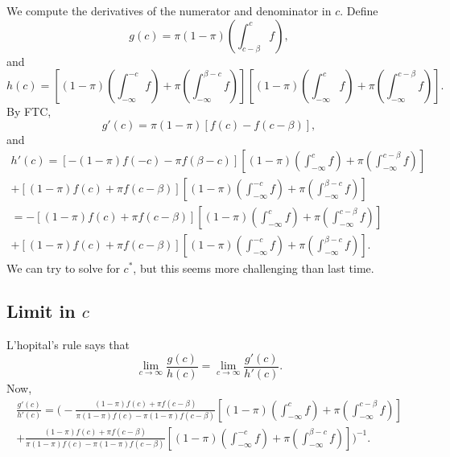 \documentclass[12pt]{article}
\begin{document}
We compute the derivatives of the numerator and denominator in $c$. Define $$g(c) = \pi (1-\pi) \left( \int_{c-\beta}^c f \right),$$ and $$ h(c) = \left[ (1-\pi)  \left( \int_{-\infty}^{-c} f \right)+ \pi \left( \int_{-\infty}^{\beta - c} f\right) \right] \left[  (1 - \pi) \left( \int_{-\infty}^c f \right) + \pi \left( \int_{-\infty}^{c- \beta} f\right)  \right].$$ By FTC,
$$ g'(c) = \pi (1 -\pi) [  f(c) - f(c - \beta)],$$ and
\begin{multline*}
h'(c) = [-(1-\pi) f(-c) - \pi f(\beta - c)] \left[  (1 - \pi) \left( \int_{-\infty}^c f \right) + \pi \left( \int_{-\infty}^{c- \beta} f\right)  \right] \\ + \left[ (1-\pi) f(c) + \pi f(c - \beta) \right]\left[ (1-\pi)  \left( \int_{-\infty}^{-c} f \right)+ \pi \left( \int_{-\infty}^{\beta - c} f\right) \right] \\ = -[(1-\pi) f(c) + \pi f(c - \beta)] \left[  (1 - \pi) \left( \int_{-\infty}^c f \right) + \pi \left( \int_{-\infty}^{c- \beta} f\right)  \right] \\ + \left[ (1-\pi) f(c) + \pi f(c - \beta) \right]\left[ (1-\pi)  \left( \int_{-\infty}^{-c} f \right)+ \pi \left( \int_{-\infty}^{\beta - c} f\right) \right].
\end{multline*}
We can try to solve for $c^*$, but this seems more challenging than last time.

\subsection{Limit in $c$}

L'hopital's rule says that
$$\lim_{c \to \infty} \frac{g(c)}{h(c)} = \lim_{c \to \infty} \frac{g'(c)}{h'(c)}.$$ Now,
\begin{multline*}
\frac{g'(c)}{h'(c)} = \Bigg(-\frac{ (1-\pi) f(c) + \pi f(c - \beta) }{ \pi (1-\pi) f(c) - \pi (1-\pi) f(c - \beta) } \left[ (1 - \pi) \left( \int_{-\infty}^c f \right) + \pi \left( \int_{-\infty}^{c- \beta} f\right) \right] \\ + \frac{ (1-\pi) f(c) + \pi f(c - \beta) }{ \pi (1-\pi) f(c) - \pi (1-\pi) f(c - \beta)}\left[ (1-\pi)  \left( \int_{-\infty}^{-c} f \right)+ \pi \left( \int_{-\infty}^{\beta - c} f\right) \right] \Bigg)^{-1}.
\end{multline*}
\end{document}
